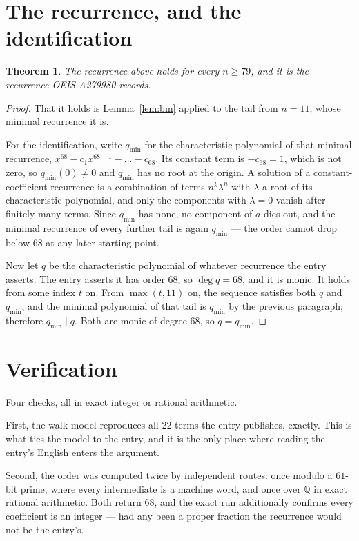 \documentclass[11pt,a4paper]{article}
\theoremstyle{plain}
\newtheorem{theorem}{Theorem}
\theoremstyle{definition}
\begin{document}
\section{The recurrence, and the identification}

\begin{theorem}
The recurrence above holds for every $n\ge79$, and it is the recurrence OEIS A279980 records.
\end{theorem}

\begin{proof}
That it holds is Lemma~\ref{lem:bm} applied to the tail from $n=11$, whose minimal
recurrence it is.

For the identification, write $q_{\min}$ for the characteristic polynomial of that minimal
recurrence, $x^{68}-c_1x^{68-1}-\dots-c_{68}$. Its constant term is
$-c_{68}=1$, which is not zero, so $q_{\min}(0)\neq0$ and $q_{\min}$ has no
root at the origin. A solution of a constant-coefficient recurrence is a combination of terms
$n^{k}\lambda^{n}$ with $\lambda$ a root of its characteristic polynomial, and only the
components with $\lambda=0$ vanish after finitely many terms. Since $q_{\min}$ has none, no
component of $a$ dies out, and the minimal recurrence of every further tail is again
$q_{\min}$ --- the order cannot drop below $68$ at any later starting point.

Now let $q$ be the characteristic polynomial of whatever recurrence the entry asserts. The
entry asserts it has order $68$, so $\deg q=68$, and it is monic. It holds from some
index $t$ on. From $\max(t,11)$ on, the sequence satisfies both $q$ and $q_{\min}$, and
the minimal polynomial of that tail is $q_{\min}$ by the previous paragraph; therefore
$q_{\min}\mid q$. Both are monic of degree $68$, so $q=q_{\min}$.
\end{proof}

\section{Verification}

Four checks, all in exact integer or rational arithmetic.

First, the walk model reproduces all $22$ terms the entry publishes, exactly. This is
what ties the model to the entry, and it is the only place where reading the entry's English
enters the argument.

Second, the order was computed twice by independent routes: once modulo a $61$-bit prime, where
every intermediate is a machine word, and once over $\mathbb{Q}$ in exact rational arithmetic.
Both return $68$, and the exact run additionally confirms every coefficient is an integer
--- had any been a proper fraction the recurrence would not be the entry's.
\end{document}
